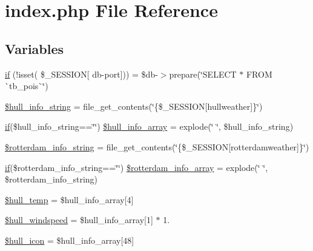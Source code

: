 \hypertarget{index_8php}{}\section{index.\+php File Reference}
\label{index_8php}
\subsection*{Variables}
\begin{DoxyCompactItemize}
\item 
\mbox{\hyperlink{index_8php_ae74920025a5793b6cc131192b92d8066}{if}} (!isset( \$\+\_\+\+S\+E\+S\+S\+I\+ON\mbox{[} \textquotesingle{}db-\/port\textquotesingle{}\mbox{]})) = \$db-\/$>$prepare(\char`\"{}S\+E\+L\+E\+CT $\ast$ F\+R\+OM \`{}tb\+\_\+pois\`{}\char`\"{})
\item 
\mbox{\hyperlink{index_8php_a35ce57643e0a8f4a8bb0c194778fb4e9}{\$hull\+\_\+info\+\_\+string}} = file\+\_\+get\+\_\+contents(\char`\"{}\{\$\+\_\+\+S\+E\+S\+S\+I\+ON\mbox{[}\textquotesingle{}hullweather\textquotesingle{}\mbox{]}\}\char`\"{})
\item 
\mbox{\hyperlink{hull_2index_8php_a8f0d8893361d6307986497540738a8bf}{if}}(\$hull\+\_\+info\+\_\+string==\char`\"{}\char`\"{}) \mbox{\hyperlink{index_8php_a24a4e2c16fb7ceee7c12646ce56597e4}{\$hull\+\_\+info\+\_\+array}} = explode(\char`\"{} \char`\"{}, \$hull\+\_\+info\+\_\+string)
\item 
\mbox{\hyperlink{index_8php_ab3e2cf8e37214ce4445068e865eaf9bd}{\$rotterdam\+\_\+info\+\_\+string}} = file\+\_\+get\+\_\+contents(\char`\"{}\{\$\+\_\+\+S\+E\+S\+S\+I\+ON\mbox{[}\textquotesingle{}rotterdamweather\textquotesingle{}\mbox{]}\}\char`\"{})
\item 
\mbox{\hyperlink{hull_2index_8php_a8f0d8893361d6307986497540738a8bf}{if}}(\$rotterdam\+\_\+info\+\_\+string==\char`\"{}\char`\"{}) \mbox{\hyperlink{index_8php_a3fad30a9e50ca634f5d9da231e879994}{\$rotterdam\+\_\+info\+\_\+array}} = explode(\char`\"{} \char`\"{}, \$rotterdam\+\_\+info\+\_\+string)
\item 
\mbox{\hyperlink{index_8php_a0e5fa38b5556b79fc1dedc0611a0ac43}{\$hull\+\_\+temp}} = \$hull\+\_\+info\+\_\+array\mbox{[}4\mbox{]}
\item 
\mbox{\hyperlink{index_8php_a157ea9ca0609284bf0acb10039e57ece}{\$hull\+\_\+windspeed}} = \$hull\+\_\+info\+\_\+array\mbox{[}1\mbox{]} $\ast$ 1.
\item 
\mbox{\hyperlink{index_8php_a21259db6d85456f627a1b906d8def681}{\$hull\+\_\+icon}} = \$hull\+\_\+info\+\_\+array\mbox{[}48\mbox{]}

\end{DoxyCompactItemize}
